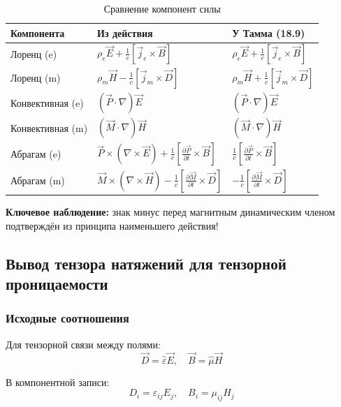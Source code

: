 \documentclass[a4paper,12pt]{article}
\begin{document}
\begin{table}[h]
\centering
\caption{Сравнение компонент силы}
\label{tab:force_comparison}
\begin{tabular}{@{}lll@{}}
\toprule
\textbf{Компонента} & \textbf{Из действия} & \textbf{У Тамма (18.9)} \\
\midrule
Лоренц (e) & $\rho_e\vec{E} + \frac{1}{c}[\vec{j}_e\times\vec{B}]$ & $\rho_e\vec{E} + \frac{1}{c}[\vec{j}_e\times\vec{B}]$ \\
Лоренц (m) & $\rho_m\vec{H} - \frac{1}{c}[\vec{j}_m\times\vec{D}]$ & $\rho_m\vec{H} + \frac{1}{c}[\vec{j}_m\times\vec{D}]$ \\
Конвективная (e) & $(\vec{P}\cdot\nabla)\vec{E}$ & $(\vec{P}\cdot\nabla)\vec{E}$ \\
Конвективная (m) & $(\vec{M}\cdot\nabla)\vec{H}$ & $(\vec{M}\cdot\nabla)\vec{H}$ \\
Абрагам (e) & $\vec{P}\times(\nabla\times\vec{E}) + \frac{1}{c}\left[\frac{\partial\vec{P}}{\partial t}\times\vec{B}\right]$ & $\frac{1}{c}\left[\frac{\partial\vec{P}}{\partial t}\times\vec{B}\right]$ \\
Абрагам (m) & $\vec{M}\times(\nabla\times\vec{H}) - \frac{1}{c}\left[\frac{\partial\vec{M}}{\partial t}\times\vec{D}\right]$ & $-\frac{1}{c}\left[\frac{\partial\vec{M}}{\partial t}\times\vec{D}\right]$ \\
\bottomrule
\end{tabular}
\end{table}

\textbf{Ключевое наблюдение:} знак минус перед магнитным динамическим членом подтверждён из принципа наименьшего действия!

\subsection{Вывод тензора натяжений для тензорной проницаемости}

\subsubsection{Исходные соотношения}

Для тензорной связи между полями:
\begin{equation}
\vec{D} = \hat{\varepsilon}\vec{E}, \quad \vec{B} = \hat{\mu}\vec{H}
\label{eq:constitutive_tensor}
\end{equation}

В компонентной записи:
\begin{equation}
D_i = \varepsilon_{ij} E_j, \quad B_i = \mu_{ij} H_j
\label{eq:constitutive_components}
\end{equation}
\end{document}
